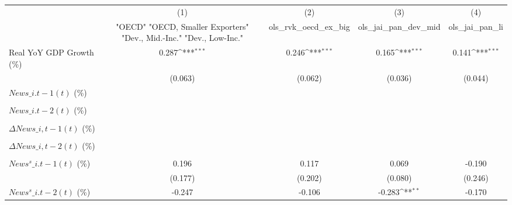 {
\def\sym#1{\ifmmode^{#1}\else\(^{#1}\)\fi}
\begin{tabular}{l*{4}{c}}
\toprule
                    &\multicolumn{1}{c}{(1)}&\multicolumn{1}{c}{(2)}&\multicolumn{1}{c}{(3)}&\multicolumn{1}{c}{(4)}\\
                    &\multicolumn{1}{c}{ "OECD" "OECD, Smaller Exporters" "Dev., Mid.-Inc." "Dev., Low-Inc."}&\multicolumn{1}{c}{ols\_rvk\_oecd\_ex\_big}&\multicolumn{1}{c}{ols\_jai\_pan\_dev\_mid}&\multicolumn{1}{c}{ols\_jai\_pan\_li}\\
\midrule
Real YoY GDP Growth (\%)&       0.287\sym{***}&       0.246\sym{***}&       0.165\sym{***}&       0.141\sym{***}\\
                    &     (0.063)         &     (0.062)         &     (0.036)         &     (0.044)         \\
\addlinespace
$ News\_{i.t-1}(t)$ (\%)&                     &                     &                     &                     \\
                    &                     &                     &                     &                     \\
\addlinespace
$ News\_{i.t-2}(t)$ (\%)&                     &                     &                     &                     \\
                    &                     &                     &                     &                     \\
\addlinespace
$ \Delta News\_{i,t-1}(t)$ (\%)&                     &                     &                     &                     \\
                    &                     &                     &                     &                     \\
\addlinespace
$ \Delta News\_{i,t-2}(t)$ (\%)&                     &                     &                     &                     \\
                    &                     &                     &                     &                     \\
\addlinespace
$ News^s\_{i.t-1}(t)$ (\%)&       0.196         &       0.117         &       0.069         &      -0.190         \\
                    &     (0.177)         &     (0.202)         &     (0.080)         &     (0.246)         \\
\addlinespace
$ News^s\_{i.t-2}(t)$ (\%)&      -0.247         &      -0.106         &      -0.283\sym{**} &      -0.170         \\

\end{tabular}}
